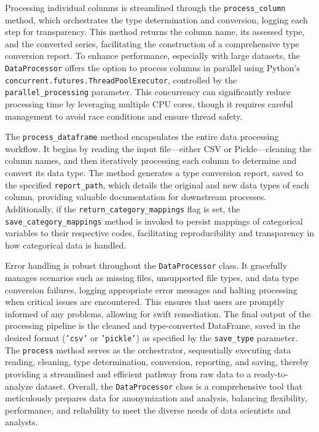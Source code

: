 \documentclass{article}
\begin{document}
Processing individual columns is streamlined through the \texttt{process\_column} method, which orchestrates the type determination and conversion, logging each step for transparency. This method returns the column name, its assessed type, and the converted series, facilitating the construction of a comprehensive type conversion report. To enhance performance, especially with large datasets, the \texttt{DataProcessor} offers the option to process columns in parallel using Python's \texttt{concurrent.futures.ThreadPoolExecutor}, controlled by the \texttt{parallel\_processing} parameter. This concurrency can significantly reduce processing time by leveraging multiple CPU cores, though it requires careful management to avoid race conditions and ensure thread safety.

The \texttt{process\_dataframe} method encapsulates the entire data processing workflow. It begins by reading the input file—either CSV or Pickle—cleaning the column names, and then iteratively processing each column to determine and convert its data type. The method generates a type conversion report, saved to the specified \texttt{report\_path}, which details the original and new data types of each column, providing valuable documentation for downstream processes. Additionally, if the \texttt{return\_category\_mappings} flag is set, the \texttt{save\_category\_mappings} method is invoked to persist mappings of categorical variables to their respective codes, facilitating reproducibility and transparency in how categorical data is handled.

Error handling is robust throughout the \texttt{DataProcessor} class. It gracefully manages scenarios such as missing files, unsupported file types, and data type conversion failures, logging appropriate error messages and halting processing when critical issues are encountered. This ensures that users are promptly informed of any problems, allowing for swift remediation. The final output of the processing pipeline is the cleaned and type-converted DataFrame, saved in the desired format (\texttt{'csv'} or \texttt{'pickle'}) as specified by the \texttt{save\_type} parameter. The \texttt{process} method serves as the orchestrator, sequentially executing data reading, cleaning, type determination, conversion, reporting, and saving, thereby providing a streamlined and efficient pathway from raw data to a ready-to-analyze dataset. Overall, the \texttt{DataProcessor} class is a comprehensive tool that meticulously prepares data for anonymization and analysis, balancing flexibility, performance, and reliability to meet the diverse needs of data scientists and analysts.
\end{document}
